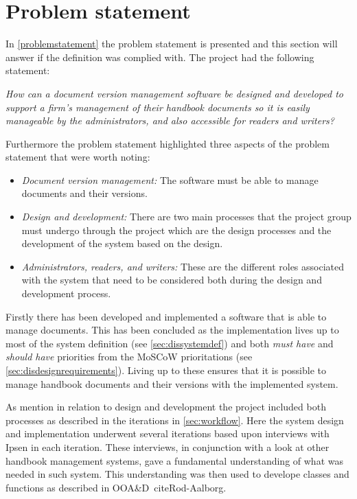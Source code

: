 \section{Problem statement}
In \cref{problemstatement} the problem statement is presented and this section will answer if the definition was complied with.
The project had the following statement:

\begin{center}
\textit{How can a document version management software be designed and developed to support a firm's management of their handbook documents so it is easily manageable by the administrators, and also accessible for readers and writers?}
\end{center}

Furthermore the problem statement highlighted three aspects of the problem statement that were worth noting:

\begin{itemize}
	\item
		\textit{Document version management:}
		The software must be able to manage documents and their versions.
	\item
		\textit{Design and development:}
		There are two main processes that the project group must undergo through the project which are the design processes and the development of the system based on the design.
	\item
		\textit{Administrators, readers, and writers:}
		These are the different roles associated with the system that need to be considered both during the design and development process.

\end{itemize}

Firstly there has been developed and implemented a software that is able to manage documents.
This has been concluded as the implementation lives up to most of the system definition (see \cref{sec:dissystemdef}) and both \textit{must have} and \textit{should have} priorities from the MoSCoW prioritations (see \cref{sec:disdesignrequirements}).
Living up to these ensures that it is possible to manage handbook documents and their versions with the implemented system.

As mention in relation to design and development the project included both processes as described in the iterations in \cref{sec:workflow}.
Here the system design and implementation underwent several iterations based upon interviews with Ipsen in each iteration.
These interviews, in conjunction with a look at other handbook management systems, gave a fundamental understanding of what was needed in such system.
This understanding was then used to develope classes and functions as described in OOA\&D\ cite{Rod-Aalborg}.

